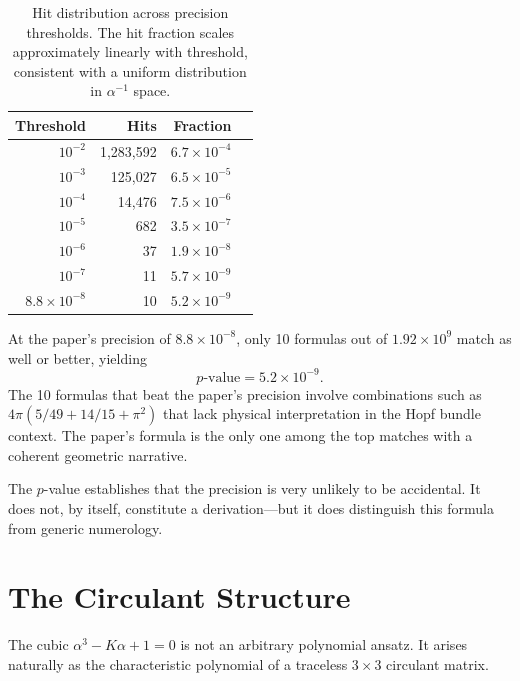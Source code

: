 \documentclass[aps,prl,twocolumn,superscriptaddress]{revtex4-2}
\begin{document}
\begin{table}[h]
\centering
\begin{tabular}{rrrr}
\hline\hline
Threshold & Hits & Fraction \\
\hline
$10^{-2}$          & 1{,}283{,}592  & $6.7 \times 10^{-4}$ \\
$10^{-3}$          &   125{,}027    & $6.5 \times 10^{-5}$ \\
$10^{-4}$          &    14{,}476    & $7.5 \times 10^{-6}$ \\
$10^{-5}$          &       682      & $3.5 \times 10^{-7}$ \\
$10^{-6}$          &        37      & $1.9 \times 10^{-8}$ \\
$10^{-7}$          &        11      & $5.7 \times 10^{-9}$ \\
$8.8\times 10^{-8}$ &       10      & $5.2 \times 10^{-9}$ \\
\hline\hline
\end{tabular}
\caption{Hit distribution across precision thresholds. The hit
fraction scales approximately linearly with threshold, consistent with
a uniform distribution in $\alpha^{-1}$ space.}
\label{tab:hits}
\end{table}

At the paper's precision of $8.8 \times 10^{-8}$, only 10 formulas
out of $1.92 \times 10^9$ match as well or better, yielding
\begin{equation}
  \boxed{p\text{-value} = 5.2 \times 10^{-9}.}
\end{equation}
The 10 formulas that beat the paper's precision involve combinations
such as $4\pi(5/49 + 14/15 + \pi^2)$ that lack physical
interpretation in the Hopf bundle context. The paper's formula is the
only one among the top matches with a coherent geometric narrative.

The $p$-value establishes that the precision is very unlikely to be
accidental. It does not, by itself, constitute a derivation---but it
does distinguish this formula from generic numerology.


\section{The Circulant Structure}

The cubic $\alpha^3 - K\alpha + 1 = 0$ is not an arbitrary polynomial
ansatz. It arises naturally as the characteristic polynomial of a
traceless $3 \times 3$ circulant matrix.
\end{document}
